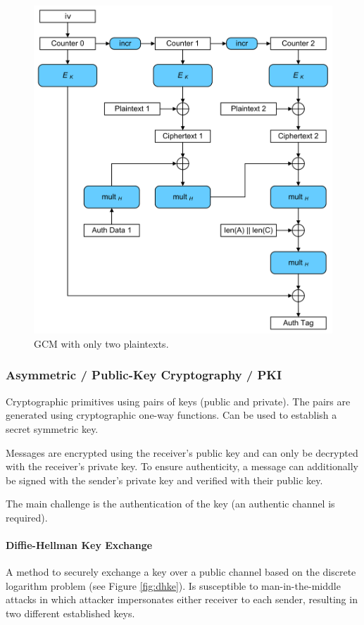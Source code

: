 \begin{figure}[h]
	\centering
	\includegraphics[scale=0.2]{images/1-gcm.png}
	\caption{GCM with only two plaintexts.}
	\label{fig:gcm}
\end{figure}


\subsubsection{Asymmetric / Public-Key Cryptography / PKI}


Cryptographic primitives using pairs of keys (public and private). The pairs are generated using cryptographic one-way functions. Can be used to establish a secret symmetric key.

Messages are encrypted using the receiver's public key and can only be decrypted with the receiver's private key. To ensure authenticity, a message can additionally be signed with the sender's private key and verified with their public key.

The main challenge is the authentication of the key (an authentic channel is required).

\paragraph{Diffie-Hellman Key Exchange}
A method to securely exchange a key over a public channel based on the discrete logarithm problem (see Figure \ref{fig:dhke}). Is susceptible to man-in-the-middle attacks in which attacker impersonates either receiver to each sender, resulting in two different established keys.

